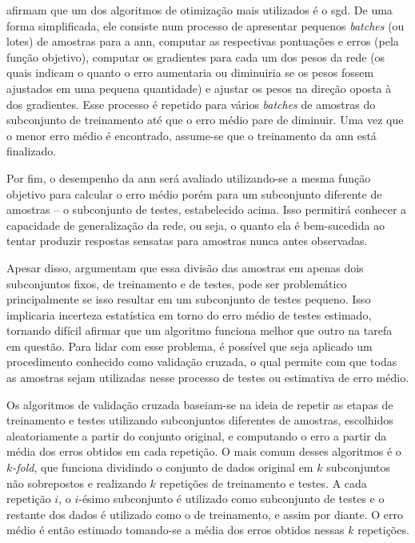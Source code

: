  afirmam que um dos algoritmos de otimização mais utilizados é o \acrfull{sgd}.
De uma forma simplificada, ele consiste num processo de apresentar pequenos \textit{batches} (ou lotes) de amostras para a \acrshort{ann}, computar as respectivas pontuações e erros (pela função objetivo), computar os gradientes para cada um dos pesos da rede (os quais indicam o quanto o erro aumentaria ou diminuiria se os pesos fossem ajustados em uma pequena quantidade) e ajustar os pesos na direção oposta à dos gradientes.
Esse processo é repetido para vários \textit{batches} de amostras do subconjunto de treinamento até que o erro médio pare de diminuir.
Uma vez que o menor erro médio é encontrado, assume-se que o treinamento da \acrshort{ann} está finalizado.

Por fim, o desempenho da \acrshort{ann} será avaliado utilizando-se a mesma função objetivo para calcular o erro médio porém para um subconjunto diferente de amostras -- o subconjunto de testes, estabelecido acima.
Isso permitirá conhecer a capacidade de generalização da rede, ou seja, o quanto ela é bem-sucedida ao tentar produzir respostas sensatas para amostras nunca antes observadas.

Apesar disso,  argumentam que essa divisão das amostras em apenas dois subconjuntos fixos, de treinamento e de testes, pode ser problemático principalmente se isso resultar em um subconjunto de testes pequeno.
Isso implicaria incerteza estatística em torno do erro médio de testes estimado, tornando difícil afirmar que um algoritmo funciona melhor que outro na tarefa em questão.
Para lidar com esse problema, é possível que seja aplicado um procedimento conhecido como validação cruzada, o qual permite com que todas as amostras sejam utilizadas nesse processo de testes ou estimativa de erro médio.

Os algoritmos de validação cruzada baseiam-se na ideia de repetir as etapas de treinamento e testes utilizando subconjuntos diferentes de amostras, escolhidos aleatoriamente a partir do conjunto original, e computando o erro a partir da média dos erros obtidos em cada repetição. 
O mais comum desses algoritmos é o \textit{\(k\)-fold}, que funciona dividindo o conjunto de dados original em \(k\) subconjuntos não sobrepostos e realizando \(k\) repetições de treinamento e testes. 
A cada repetição \(i\), o \(i\)-ésimo subconjunto é utilizado como subconjunto de testes e o restante dos dados é utilizado como o de treinamento, e assim por diante.
O erro médio é então estimado tomando-se a média dos erros obtidos nessas \(k\) repetições.


